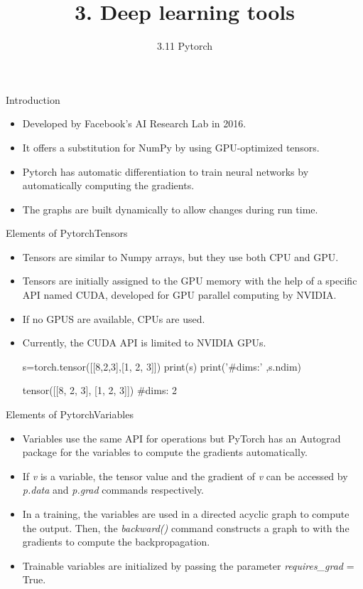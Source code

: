 \documentclass{beamer}
\title{3. Deep learning tools}
\subtitle{3.11 Pytorch}
\begin{document}
\maketitle

\begin{frame}{Introduction}
\begin{itemize}
\item Developed by Facebook's AI Research Lab in 2016. 
\item It offers a substitution for NumPy by using GPU-optimized tensors.  
\item Pytorch has automatic differentiation to train neural networks by automatically computing the gradients.
\item The graphs are built dynamically to allow  changes during run time. 
\end{itemize}
\end{frame}




\begin{frame}[fragile]{Elements of Pytorch}{Tensors}
\begin{itemize}
\item Tensors are similar to Numpy arrays, but they use both CPU and GPU. 
\item  Tensors are initially assigned to the GPU memory with the help of a specific API named CUDA, developed for GPU parallel computing by NVIDIA.
\item If no GPUS are available, CPUs are used. 
\item Currently, the CUDA API is limited to  NVIDIA GPUs.
\begin{python}
s=torch.tensor([[8,2,3],[1, 2, 3]]) 
print(s)
print('#dims:' ,s.ndim) 
\end{python}

\begin{python}
tensor([[8, 2, 3],
        [1, 2, 3]])
#dims: 2
\end{python}
\end{itemize}
\end{frame}



\begin{frame}[fragile]{Elements of Pytorch}{Variables}
    \begin{itemize}
\item Variables use the same API for operations but PyTorch has an Autograd package for the variables to compute the gradients automatically. 
\item 
If \emph{v} is a variable, the tensor value and the gradient of \emph{v} can be accessed by \emph{p.data} and \emph{p.grad} commands respectively.  
\item In a training, the variables are used in a directed acyclic graph to compute the output. Then, the \emph{backward()} command constructs a graph to with the gradients to compute the backpropagation.  
\item Trainable variables are initialized by passing the parameter \emph{requires\_grad} = True.\\
    \end{itemize}
\end{frame}
\end{document}
